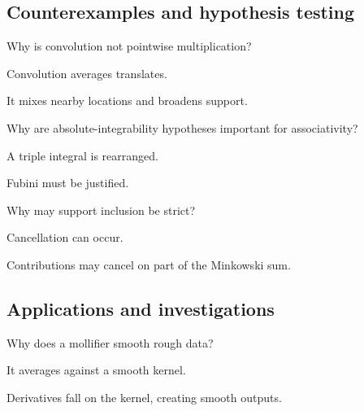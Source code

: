 \subsection*{Counterexamples and hypothesis testing}

\begin{exercise}\label{exr:iii10-expand-10}
Why is convolution not pointwise multiplication?
\end{exercise}
\begin{hint}
Convolution averages translates.
\end{hint}
\begin{solution}
It mixes nearby locations and broadens support.
\end{solution}

\begin{exercise}\label{exr:iii10-expand-11}
Why are absolute-integrability hypotheses important for associativity?
\end{exercise}
\begin{hint}
A triple integral is rearranged.
\end{hint}
\begin{solution}
Fubini must be justified.
\end{solution}

\begin{exercise}\label{exr:iii10-expand-12}
Why may support inclusion be strict?
\end{exercise}
\begin{hint}
Cancellation can occur.
\end{hint}
\begin{solution}
Contributions may cancel on part of the Minkowski sum.
\end{solution}

\subsection*{Applications and investigations}

\begin{exercise}[Smoothing]\label{exr:iii10-expand-13}
Why does a mollifier smooth rough data?
\end{exercise}
\begin{hint}
It averages against a smooth kernel.
\end{hint}
\begin{solution}
Derivatives fall on the kernel, creating smooth outputs.
\end{solution}

